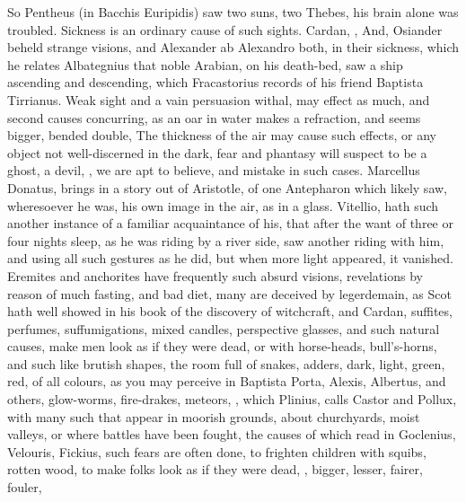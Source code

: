 {So Pentheus (in Bacchis Euripidis) saw two suns, two Thebes, his brain alone
was troubled. Sickness is an ordinary cause of such sights. Cardan,
 , \etc{} And, Osiander beheld strange visions, and
Alexander ab Alexandro both, in their sickness, which he relates
 Albategnius that
noble Arabian, on his death-bed, saw a ship ascending and descending, which
Fracastorius records of his friend Baptista Tirrianus. Weak sight and a vain
persuasion withal, may effect as much, and second causes concurring, as an oar
in water makes a refraction, and seems bigger, bended double, \etc{} The
thickness of the air may cause such effects, or any object not well-discerned
in the dark, fear and phantasy will suspect to be a ghost, a devil, \etc{}
, we are
apt to believe, and mistake in such cases. Marcellus Donatus,
 brings in a story out of Aristotle, of
one Antepharon which likely saw, wheresoever he was, his own image in the air,
as in a glass. Vitellio,  hath such
another instance of a familiar acquaintance of his, that after the want of
three or four nights sleep, as he was riding by a river side, saw another
riding with him, and using all such gestures as he did, but when more light
appeared, it vanished. Eremites and anchorites have frequently such absurd
visions, revelations by reason of much fasting, and bad diet, many are deceived
by legerdemain, as Scot hath well showed in his book of the discovery of
witchcraft, and Cardan,  suffites, perfumes,
suffumigations, mixed candles, perspective glasses, and such natural causes,
make men look as if they were dead, or with horse-heads, bull's-horns, and such
like brutish shapes, the room full of snakes, adders, dark, light, green, red,
of all colours, as you may perceive in Baptista Porta, Alexis, Albertus, and
others, glow-worms, fire-drakes, meteors, , which Plinius,
 calls Castor and Pollux, with many such
that appear in moorish grounds, about churchyards, moist valleys, or where
battles have been fought, the causes of which read in Goclenius, Velouris,
Fickius, \etc{} such fears are often done, to frighten children with squibs,
rotten wood, \etc{} to make folks look as if they were dead,
, bigger, lesser, fairer, fouler,
}
